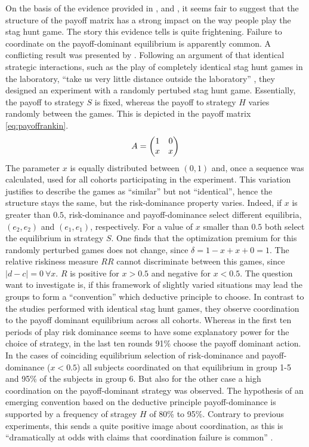 On the basis of the evidence provided in \textcite{battalio_optimization_2001},
\textcite{schmidt_playing_2003} and \textcite{dubois_optimization_2012},
it seems fair to suggest that the structure of the payoff matrix has a 
strong impact on the way people play the stag hunt game.   
The story this evidence tells is quite frightening. Failure to coordinate 
on the payoff-dominant equilibrium is apparently common. 
A conflicting result was presented by \textcite{rankin_strategic_2000}.
Following an argument of \textcite{kreps_game_1990} that identical strategic 
interactions, such as the play of completely identical stag hunt games 
in the laboratory, ``take us very little distance outside the laboratory'' 
\parencite[212]{kreps_game_1990}, 
they designed an experiment with a randomly 
pertubed stag hunt game. Essentially, the payoff to strategy $S$ is fixed, 
whereas the payoff to strategy $H$ varies randomly between the games. This is
depicted in the payoff matrix  \eqref{eq:payoffrankin}.
\begin{align}
        \label{eq:payoffrankin}
        A = \mqty(1 & 0 \\ x & x)
\end{align}        
The parameter $x$ is equally distributed between $(0,1)$ and, once a sequence
was calculated, used for all cohorts participating in the experiment. This
variation justifies to describe the games as ``similar'' but not
``identical'', hence the structure stays the same, but the risk-dominance 
property varies. Indeed, if $x$ is greater than $0.5$, risk-dominance and
payoff-dominance select different equilibria, $(e_2,e_2)$ and $(e_1,e_1)$,
respectively. For a value of $x$ smaller than $0.5$ both select 
the equilibrium in strategy $S$. One finds that the optimization premium for 
this randomly perturbed games does not change, since $\delta=1-x+x+0=1$. 
The relative riskiness measure $RR$ cannot discriminate between this games,
since $|d-c|=0\ \forall x$. $R$ is positive for $x > 0.5$ and 
negative for $x <0.5$. The question \textcite{rankin_strategic_2000}
want to investigate is, if this framework of slightly varied situations may
lead the groups to form a ``convention'' which deductive principle to choose. 
In contrast to the studies performed with identical stag hunt games, they 
observe coordination to the payoff dominant equilibrium across
all cohorts. Whereas in the first ten periods of play risk dominance seems
to have some explanatory power for the choice of strategy, in the last ten
rounds 91\% choose the payoff dominant action. 
In the cases of coinciding equilibrium selection of risk-dominance and 
payoff-dominance ($x < 0.5$) all subjects coordinated on that equilibrium in 
group 1-5 and 95\% of the subjects in group 6. But also for the other case a 
high coordination on the payoff-dominant strategy was observed.
The hypothesis of an emerging convention based on the deductive principle
payoff-dominance is supported by a frequency of stragey $H$ of 80\% to 95\%.
Contrary to previous experiments, this sends 
a quite positive image about coordination, as this is 
``dramatically at odds with claims that coordination failure is common''
\parencite[9]{devetag_when_2007}. 

